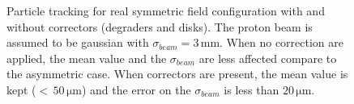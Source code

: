\begin{figure}[!h]
	\begin{center}
		
	\end{center}
	\caption[Particle tracking for real symmetric field configuration with and without correctors]{Particle tracking for real symmetric field configuration with and without correctors (degraders and disks). The proton beam is assumed to be gaussian with $\sigma_{beam}=3\,\mathrm{mm}$. When no correction are applied, the mean value and the $\sigma_{beam}$ are less affected compare to the asymmetric case. When correctors are present, the mean value is kept ($<\,50\,\mathrm{\mu m}$) and the error on the $\sigma_{beam}$ is less than $20\,\mathrm{\mu m}$.}
	\label{chap3:SymTransversalProfile}
\end{figure}
